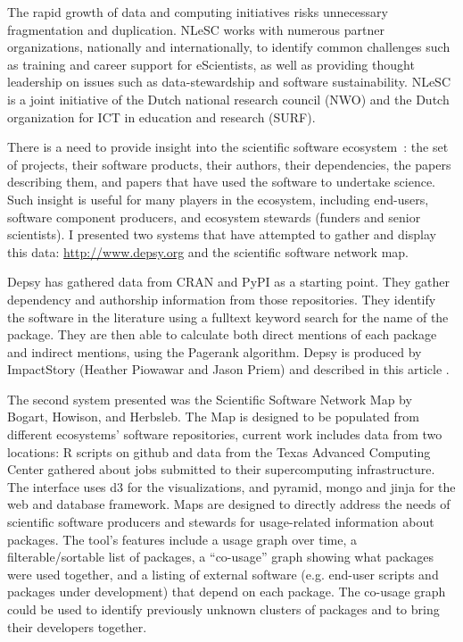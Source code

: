 \documentclass[a4paper,UKenglish]{dagrep}
\begin{document}
The rapid growth of data and computing initiatives risks unnecessary
fragmentation and duplication. NLeSC works with numerous partner
organizations, nationally and internationally, to identify common
challenges such as training and career support for eScientists, as
well as providing thought leadership on issues such as
data-stewardship and software sustainability. NLeSC is a joint
initiative of the Dutch national research council (NWO) and the Dutch
organization for ICT in education and research (SURF).





There is a need to provide insight into the scientific software ecosystem~\cite{bogart_mapping_2015}: the set of projects, their software products, their authors, their dependencies, the papers describing them, and papers that have used the software to undertake science.  Such insight is useful for many players in the ecosystem, including end-users, software component producers, and ecosystem stewards (funders and senior scientists). I presented two systems that have attempted to gather and display this data: \href{depsy.org}{http://www.depsy.org} and the scientific software network map.

Depsy has gathered data from CRAN and PyPI as a starting point. They gather dependency and authorship information from those repositories. They identify the software in the literature using a fulltext keyword search for the name of the package. They are then able to calculate both direct mentions of each package and indirect mentions, using the Pagerank algorithm.  Depsy is produced by ImpactStory (Heather Piowawar and Jason Priem) and described in this article \cite{singh_chawla_unsung_2016}.

The second system presented was the Scientific Software Network Map by Bogart, Howison, and Herbsleb. The Map is designed to be populated from different ecosystems' software repositories, current work includes data from two locations: R scripts on github and data from the Texas Advanced Computing Center gathered about jobs submitted to their supercomputing infrastructure.  The interface uses d3 for the visualizations, and pyramid, mongo and jinja for the web and database framework. Maps are designed to directly address the needs of scientific software producers and stewards for usage-related information about packages. The tool's features include a usage graph over time, a filterable/sortable list of packages, a ``co-usage'' graph showing what packages were used together, and a listing of external software (e.g. end-user scripts and packages under development) that depend on each package. The co-usage graph could be used to identify previously unknown clusters of packages and to bring their developers together.
\end{document}

